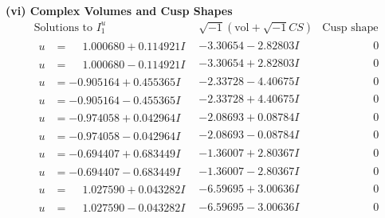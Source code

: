 \documentclass[1p]{elsarticle_modified}
\theoremstyle{definition}
\newcommand{\I}{\sqrt{-1}}
\begin{document}
\newpage\flushleft \textbf{(vi) Complex Volumes and Cusp Shapes}
$$\begin{array}{c|c|c}  
\text{Solutions to }I^u_{1}& \I (\text{vol} + \sqrt{-1}CS) & \text{Cusp shape}\\
 \hline 
\begin{aligned}
u &= \phantom{-}1.000680 + 0.114921 I\end{aligned}
 & -3.30654 - 2.82803 I & \phantom{-0.000000 } 0 \\ \hline\begin{aligned}
u &= \phantom{-}1.000680 - 0.114921 I\end{aligned}
 & -3.30654 + 2.82803 I & \phantom{-0.000000 } 0 \\ \hline\begin{aligned}
u &= -0.905164 + 0.455365 I\end{aligned}
 & -2.33728 - 4.40675 I & \phantom{-0.000000 } 0 \\ \hline\begin{aligned}
u &= -0.905164 - 0.455365 I\end{aligned}
 & -2.33728 + 4.40675 I & \phantom{-0.000000 } 0 \\ \hline\begin{aligned}
u &= -0.974058 + 0.042964 I\end{aligned}
 & -2.08693 + 0.08784 I & \phantom{-0.000000 } 0 \\ \hline\begin{aligned}
u &= -0.974058 - 0.042964 I\end{aligned}
 & -2.08693 - 0.08784 I & \phantom{-0.000000 } 0 \\ \hline\begin{aligned}
u &= -0.694407 + 0.683449 I\end{aligned}
 & -1.36007 + 2.80367 I & \phantom{-0.000000 } 0 \\ \hline\begin{aligned}
u &= -0.694407 - 0.683449 I\end{aligned}
 & -1.36007 - 2.80367 I & \phantom{-0.000000 } 0 \\ \hline\begin{aligned}
u &= \phantom{-}1.027590 + 0.043282 I\end{aligned}
 & -6.59695 + 3.00636 I & \phantom{-0.000000 } 0 \\ \hline\begin{aligned}
u &= \phantom{-}1.027590 - 0.043282 I\end{aligned}
 & -6.59695 - 3.00636 I & \phantom{-0.000000 } 0 \\ \hline\begin{aligned}

\end{aligned}
\end{array}$$
\end{document}
